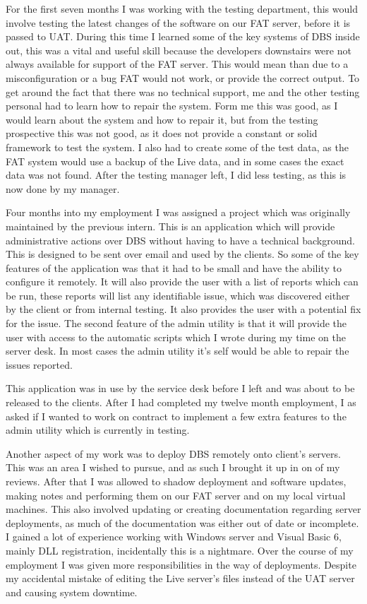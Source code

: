 \documentclass[paper=a4, fontsize=11pt]{scrartcl}	%
\begin{document}
For the first seven months I was working with the testing department, this would involve testing the latest changes of the software on our FAT server, before it is passed to UAT. During this time I learned some of the key systems of DBS inside out, this was a vital and useful skill because the developers downstairs were not always available for support of the FAT server. This would mean than due to a misconfiguration or a bug FAT would not work, or provide the correct output. To get around the fact that there was no technical support, me and the other testing personal had to learn how to repair the system. Form me this was good, as I would learn about the system and how to repair it, but from the testing prospective this was not good, as it does not provide a constant or solid framework to test the system. I also had to create some of the test data, as the FAT system would use a backup of the Live data, and in some cases the exact data was not found. After the testing manager left, I did less testing, as this is now done by my manager.

Four months into my employment I was assigned a project which was originally maintained by the previous intern. This is an application which will provide administrative actions over DBS without having to have a technical background. This is designed to be sent over email and used by the clients. So some of the key features of the application was that it had to be small and have the ability to configure it remotely. It will also provide the user with a list of reports which can be run, these reports will list any identifiable issue, which was discovered either by the client or from internal testing. It also provides the user with a potential fix for the issue. The second feature of the admin utility is that it will provide the user with access to the automatic scripts which I wrote during my time on the server desk. In most cases the admin utility it's self would be able to repair the issues reported.

This application was in use by the service desk before I left and was about to be released to the clients. After I had completed my twelve month employment, I as asked if I wanted to work on contract to implement a few extra features to the admin utility which is currently in testing.

Another aspect of my work was to deploy DBS remotely onto client's servers. This was an area I wished to pursue, and as such I brought it up in on of my reviews.  After that I was allowed to  shadow deployment and software updates, making notes and performing them on our FAT server and on my local virtual machines. This also involved updating or creating documentation regarding server deployments, as much of the documentation was either out of date or incomplete. I gained a lot of experience working with Windows server and Visual Basic 6, mainly DLL registration, incidentally this is a nightmare. Over the course of my employment I was given more responsibilities in the way of deployments. Despite my accidental mistake of editing the Live server's files instead of the UAT server and causing system downtime.
\end{document}
